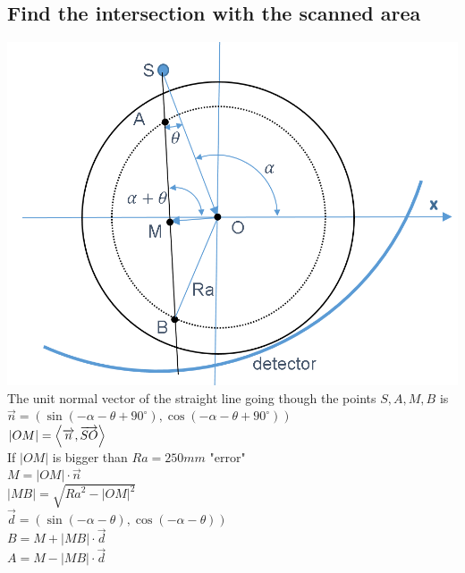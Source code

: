 \documentclass[12pt]{article}
\begin{document}
\subsection{Find the intersection with the scanned area}
\includegraphics[scale=0.5]{pic05.png}\\
The unit normal vector of the straight line going though the points $S,A,M,B$ is \\
$\overrightarrow{n}=(\sin(-\alpha-\theta+90^{\circ}),\cos(-\alpha-\theta+90^{\circ}))$ \\
$\lvert OM \rvert=\Braket{\overrightarrow{n},\overrightarrow{SO}}$\\

If $\lvert OM \rvert$ is bigger than $Ra=250 mm$ "error"\\
$M=\lvert OM \rvert \cdot \overrightarrow{n}$\\
$\lvert MB \rvert =\sqrt{{Ra}^2-\lvert OM \rvert^2}$\\

$\overrightarrow{d}=(\sin(-\alpha-\theta),\cos(-\alpha-\theta))$ \\
$ B=M+\lvert MB \rvert \cdot \overrightarrow{d}$\\
$ A=M-\lvert MB \rvert \cdot \overrightarrow{d}$\\
\end{document}
